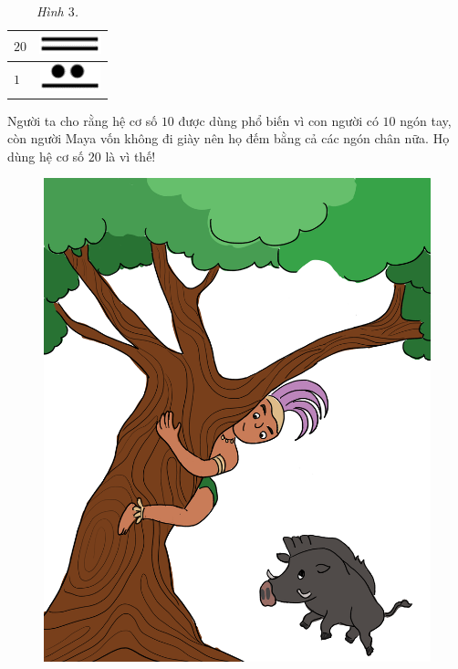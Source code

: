 \begin{multicols}{2}
\begin{table}[H]
\begin{tabular}{|l|c|}
			\hline
			$20$ & \includegraphics[scale=0.3]{35}\\
			\hline
			$1$& \includegraphics[scale=0.3]{36.png}\\
			\hline
		\end{tabular}
		\caption{\small\textit{\color{toancuabi}Hình $3$.}}
		\vspace*{-10pt}
	\end{table}
	Người ta cho rằng hệ cơ số $10$ được dùng phổ biến vì con người có $10$ ngón tay, còn người Maya vốn không đi giày nên họ đếm bằng cả các ngón chân nữa. Họ dùng hệ cơ số $20$ là vì thế!
	\begin{figure}[H]
		\centering
		\vspace*{-5pt}
		\captionsetup{labelformat= empty, justification=centering}
		\includegraphics[width=1\linewidth]{20.12-pi.4-2}

\end{figure}
\end{multicols}
